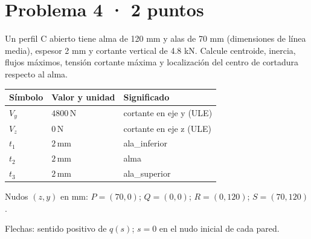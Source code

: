 \par\medskip\noindent\begin{minipage}{\linewidth}

\section{Problema 4 · 2 puntos}

Un perfil C abierto tiene alma de 120 mm y alas de 70 mm (dimensiones de línea media), espesor 2 mm y cortante vertical de 4.8 kN. Calcule centroide, inercia, flujos máximos, tensión cortante máxima y localización del centro de cortadura respecto al alma.

\par\medskip\noindent\begin{tabular}{@{}p{.18\linewidth}p{.26\linewidth}p{.48\linewidth}@{}}
\toprule Símbolo & Valor y unidad & Significado\\\midrule
$V_{y}$ & $4800\,\mathrm{N}$ & cortante en eje y (ULE)\\
$V_{z}$ & $0\,\mathrm{N}$ & cortante en eje z (ULE)\\
$t_{1}$ & $2\,\mathrm{mm}$ & ala\_inferior\\
$t_{2}$ & $2\,\mathrm{mm}$ & alma\\
$t_{3}$ & $2\,\mathrm{mm}$ & ala\_superior\\
\bottomrule\end{tabular}\par\medskip

\par\medskip\noindent\begin{minipage}{\linewidth}\centering
{}
\par\small Nudos $(z,y)$ en mm: $P=(70,0)$; $Q=(0,0)$; $R=(0,120)$; $S=(70,120)$.
\par\small Flechas: sentido positivo de $q(s)$; $s=0$ en el nudo inicial de cada pared.
\par\normalsize\end{minipage}\par\medskip


\end{minipage}
